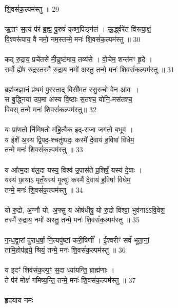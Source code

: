 शि॒वसं॑क॒ल्पम॑स्तु ॥ 29\\
\\
ऋ॒तꣳ स॒त्यं प॑रं ब्र॒ह्म॒ पु॒रुषं॑ कृष्ण॒पिङ्ग॑लं । ऊ॒र्द्ध्वरे॑तं वि॑रूपा॒क्षं॒\\
वि॒श्वरू॑पाय॒ वै नमो॒ नम॒स्तन्मे॒ मनः॑ शि॒वसं॑क॒ल्पम॑स्तु ॥ 30\\
\\
कद् रु॒द्राय॒ प्रचे॑तसे मी॒ढुष्ट॑माय॒ तव्य॑से । वो॒चेम॒ शन्त॑मꣳ हृ॒दे ।\\
सर्वो॒ ह्ये॑ष रु॒द्रस्तस्मै॑ रु॒द्राय॒ नमो॑ अस्तु॒ तन्मे॒ मनः॑ शि॒वसं॑क॒ल्पम॑स्तु ॥ 31\\
\\
ब्रह्म॑जज्ञा॒नं प्र॑थ॒मं पु॒रस्ता॒द् विसी॑म॒त स्सु॒रुचो॑ वे॒न आ॑वः ।\\
स बु॒द्ध्निया॑ उप॒मा अ॑स्य वि॒ष्ठाः स॒तश्च॒ योनि॒-मस॑तश्च॒\\
विव॒स् तन्मे॒ मनः॑ शि॒वसं॑क॒ल्पम॑स्तु॥ 32\\
\\
यः प्रा॑ण॒तो नि॑मिष॒तो म॑हि॒त्वैक॒ इद्-राजा जग॑तो ब॒भूव॑ ।\\
य ईशे॑ अ॒स्य द्वि॒पद॒-श्चतु॑ष्पदः॒ कस्मै॑ दे॒वाय॑ ह॒विषा॑ विधेम॒\\
तन्मे॒ मनः॑ शि॒वसं॑क॒ल्पम॑स्तु ॥ 33\\
\\
य आ᳚त्म॒दा ब॑ल॒दा यस्य॒ विश्व॑ उ॒पास॑ते प्र॒शिषंँ॒ यस्य॑ दे॒वाः ।\\
यस्य॑ छा॒याऽ मृतंँ॒यस्य॑ मृ॒त्युः कस्मै॑ दे॒वाय॑ ह॒विषा॑ विधेम॒\\
तन्मे॒ मनः॑ शि॒वसं॑क॒ल्पम॑स्तु ॥ 34\\
\\
यो रु॒द्रो, अ॒ग्नौ यो, अ॒फ्सु य ओष॑धीषु॒ यो रु॒द्रो विश्वा॒ भुव॑नाऽऽवि॒वेश॒\\
तस्मै॑ रु॒द्राय॒ नमो॑ अस्तु॒ तन्मे॒ मनः॑ शि॒वसं॑क॒ल्पम॑स्तु ॥ 35\\
\\
ग॒न्ध॒द्वा॒रां दु॑राध॒र्षां॒ नि॒त्यपु॑ष्टां करी॒षिणीं᳚ । ई॒श्वरीꣳ॑ सर्व॑ भूता॒नां॒\\
तामि॒होप॑ह्वये॒ श्रियं॒ तन्मे॒ मनः॑ शि॒वसं॑क॒ल्पम॑स्तु ॥ 36\\
\\
य इदꣳ॑ शिव॑संक॒ल्प॒ꣳ॒ स॒दा ध्या॑यन्ति॒ ब्राह्म॑णाः ।\\
ते प॑रं मोक्षं॑ गमिष्य॒न्ति॒ तन्मे॒ मनः॑ शि॒वसं॑क॒ल्पम॑स्तु ॥ 37\\
\\
हृदयाय नमः॑
